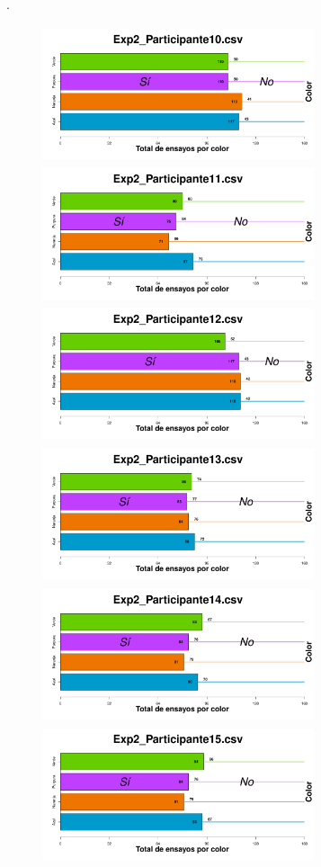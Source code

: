 \documentclass[a4paper ]{article}
\begin{document}
\vfill .
\begin{figure}[th]
\begin{center}
\includegraphics[width=8cm, height=4cm]{Figures/BiasColor_Exp2_P10} \includegraphics[width=8cm, height=4cm]{Figures/BiasColor_Exp2_P11} \includegraphics[width=8cm, height=4cm]{Figures/BiasColor_Exp2_P12}
\includegraphics[width=8cm, height=4cm]{Figures/BiasColor_Exp2_P13} \includegraphics[width=8cm, height=4cm]{Figures/BiasColor_Exp2_P14} \includegraphics[width=8cm, height=4cm]{Figures/BiasColor_Exp2_P15}

\end{center}
\end{figure}
\end{document}
